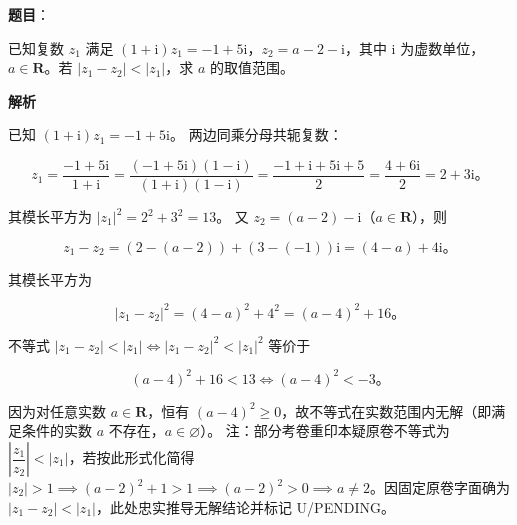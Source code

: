 \begin{answer}

\textbf{题目}：

已知复数 $z_1$ 满足 $(1 + \mathrm{i})z_1 = -1 + 5\mathrm{i}$，$z_2 = a - 2 - \mathrm{i}$，其中 $\mathrm{i}$ 为虚数单位，$a \in \mathbf{R}$。若 $|z_1 - z_2| < |z_1|$，求 $a$ 的取值范围。

\textbf{解析}

已知 $(1 + \mathrm{i})z_1 = -1 + 5\mathrm{i}$。
两边同乘分母共轭复数：

\nopagebreak[4]
\[
z_1 = \dfrac{-1 + 5\mathrm{i}}{1 + \mathrm{i}} = \dfrac{(-1 + 5\mathrm{i})(1 - \mathrm{i})}{(1 + \mathrm{i})(1 - \mathrm{i})} = \dfrac{-1 + \mathrm{i} + 5\mathrm{i} + 5}{2} = \dfrac{4 + 6\mathrm{i}}{2} = 2 + 3\mathrm{i}\mbox{。}
\]

其模长平方为 $|z_1|^2 = 2^2 + 3^2 = 13$。
又 $z_2 = (a - 2) - \mathrm{i}$（$a \in \mathbf{R}$），则

\nopagebreak[4]
\[
z_1 - z_2 = (2 - (a - 2)) + (3 - (-1))\mathrm{i} = (4 - a) + 4\mathrm{i}\mbox{。}
\]

其模长平方为

\nopagebreak[4]
\[
|z_1 - z_2|^2 = (4 - a)^2 + 4^2 = (a - 4)^2 + 16\mbox{。}
\]

不等式 $|z_1 - z_2| < |z_1| \iff |z_1 - z_2|^2 < |z_1|^2$ 等价于

\nopagebreak[4]
\[
(a - 4)^2 + 16 < 13 \iff (a - 4)^2 < -3\mbox{。}
\]

因为对任意实数 $a \in \mathbf{R}$，恒有 $(a - 4)^2 \geqslant 0$，故不等式在实数范围内无解（即满足条件的实数 $a$ 不存在，$a \in \varnothing$）。
注：部分考卷重印本疑原卷不等式为 $\left|\dfrac{z_1}{z_2}\right| < |z_1|$，若按此形式化简得 $|z_2| > 1 \implies (a - 2)^2 + 1 > 1 \implies (a - 2)^2 > 0 \implies a \ne 2$。因固定原卷字面确为 $|z_1 - z_2| < |z_1|$，此处忠实推导无解结论并标记 U/PENDING。


\end{answer}
